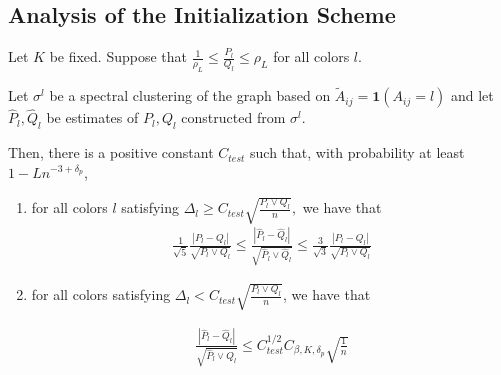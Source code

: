 

\subsection{Analysis of the Initialization Scheme}

\begin{proposition}
\label{prop:initial_guarantee}
Let $K$ be fixed. Suppose that $\frac{1}{\rho_L} \leq \frac{P_l}{Q_l} \leq \rho_L$ for all colors $l$. 

Let $\sigma^l$ be a spectral clustering of the graph based on $\tilde{A}_{ij} = \mathbf{1}(A_{ij} = l)$ and let $\hat{P}_l, \hat{Q}_l$ be estimates of $P_l, Q_l$ constructed from $\sigma^l$.

Then, there is a positive constant $C_{test}$ such that, with probability at least $1 - Ln^{-3 + \delta_p}$,

\begin{enumerate} 
\item for all colors $l$ satisfying $\Delta_l \geq C_{test} \sqrt{ \frac{P_l \vee Q_l}{n}}, $  we have that
\begin{align}
\frac{1}{\sqrt{5}} \frac{ | P_l - Q_l |}{\sqrt{P_l \vee Q_l}}  \leq \frac{ | \hat{P}_l - \hat{Q}_l| }{\sqrt{ \hat{P}_l \vee \hat{Q}_l }} \leq  
\frac{3}{\sqrt{3}} \frac{ | P_l - Q_l | }{\sqrt{ P_l \vee Q_l}} 
\end{align}

\item for all colors satisfying $\Delta_l <  C_{test} \sqrt{ \frac{P_l \vee Q_l}{n} }$, we have that

\begin{align}
\frac{ | \hat{P}_l - \hat{Q}_l|}{\sqrt{ \hat{P}_l \vee \hat{Q}_l}} \leq C_{test}^{1/2} C_{\beta, K, \delta_p} \sqrt{ \frac{1}{n} } 
\label{eqn:bad_l_initialization}
\end{align}


\end{enumerate}

\end{proposition}

